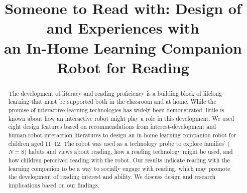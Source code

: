 \documentclass{sigchi}
\def\plaintitle{Someone to Read with: Design of and Experiences with \\ an In-Home Learning Companion Robot for Reading}
\begin{document}
\title{\plaintitle\vspace{56pt}}


\maketitle

\begin{abstract}
  The development of literacy and reading proficiency is a building block of lifelong learning that must be supported both in the classroom and at home. While the promise of interactive learning technologies has widely been demonstrated, little is known about how an interactive robot might play a role in this development. We used eight design features based on recommendations from interest-development and human-robot-interaction literatures to design an in-home learning companion robot for children aged 11--12. The robot was used as a technology probe to explore families' ($N=8$) habits and views about reading, how a reading technology might be used, and how children perceived reading with the robot. Our results indicate reading with the learning companion to be a way to socially engage with reading, which may promote the development of reading interest and ability. We discuss design and research implications based on our findings.
\end{abstract}

\end{document}
